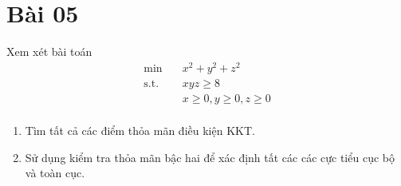 \section{Bài 05}

Xem xét bài toán
\begin{equation}
    \begin{aligned}
        \min \quad & x^2 + y^2 + z^2\\
        \textrm{s.t.} \quad & xyz \geq 8\\
          & x \geq 0, y \geq 0, z \geq 0\\
    \end{aligned}
\end{equation}

\begin{enumerate}[label=(\alph*)]
    \item Tìm tất cả các điểm thỏa mãn điều kiện KKT.
    \item Sử dụng kiểm tra thỏa mãn bậc hai để xác định tất các các cực tiểu cục bộ và toàn cục.
\end{enumerate}

